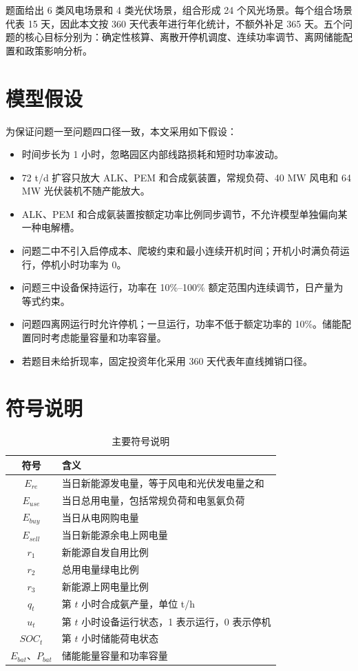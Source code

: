 \documentclass[bwprint]{gmcmthesis}
\numberwithin{figure}{section}
\numberwithin{table}{section}
\begin{document}
题面给出 6 类风电场景和 4 类光伏场景，组合形成 24 个风光场景。每个组合场景代表 15 天，因此本文按 360 天代表年进行年化统计，不额外补足 365 天。五个问题的核心目标分别为：确定性核算、离散开停机调度、连续功率调节、离网储能配置和政策影响分析。

\section{模型假设}
为保证问题一至问题四口径一致，本文采用如下假设：
\begin{itemize}
\item 时间步长为 1 小时，忽略园区内部线路损耗和短时功率波动。
\item 72 t/d 扩容只放大 ALK、PEM 和合成氨装置，常规负荷、40 MW 风电和 64 MW 光伏装机不随产能放大。
\item ALK、PEM 和合成氨装置按额定功率比例同步调节，不允许模型单独偏向某一种电解槽。
\item 问题二中不引入启停成本、爬坡约束和最小连续开机时间；开机小时满负荷运行，停机小时功率为 0。
\item 问题三中设备保持运行，功率在 10\%--100\% 额定范围内连续调节，日产量为等式约束。
\item 问题四离网运行时允许停机；一旦运行，功率不低于额定功率的 10\%。储能配置同时考虑能量容量和功率容量。
\item 若题目未给折现率，固定投资年化采用 360 天代表年直线摊销口径。
\end{itemize}

\section{符号说明}
\begin{table}[H]
\centering
\caption{主要符号说明}
\begin{tabularx}{0.96\textwidth}{cX}
\toprule
符号 & 含义 \\
\midrule
$E_{re}$ & 当日新能源发电量，等于风电和光伏发电量之和 \\
$E_{use}$ & 当日总用电量，包括常规负荷和电氢氨负荷 \\
$E_{buy}$ & 当日从电网购电量 \\
$E_{sell}$ & 当日新能源余电上网电量 \\
$r_1$ & 新能源自发自用比例 \\
$r_2$ & 总用电量绿电比例 \\
$r_3$ & 新能源上网电量比例 \\
$q_t$ & 第 $t$ 小时合成氨产量，单位 t/h \\
$u_t$ & 第 $t$ 小时设备运行状态，1 表示运行，0 表示停机 \\
$SOC_t$ & 第 $t$ 小时储能荷电状态 \\
$E_{bat}$、$P_{bat}$ & 储能能量容量和功率容量 \\
\bottomrule
\end{tabularx}
\end{table}
\end{document}
